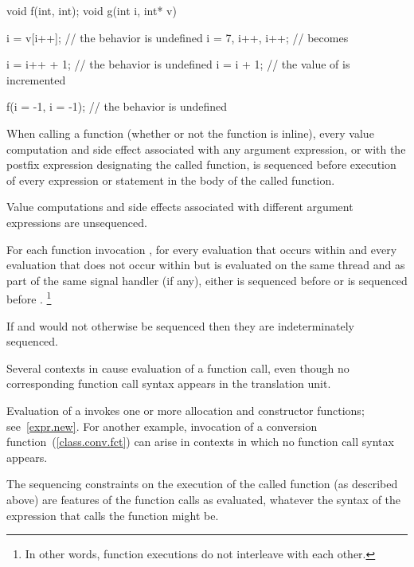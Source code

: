 \begin{example}

\begin{codeblock}
void f(int, int);
void g(int i, int* v) {
  i = v[i++];         // the behavior is undefined
  i = 7, i++, i++;    //  becomes 

  i = i++ + 1;        // the behavior is undefined
  i = i + 1;          // the value of  is incremented

  f(i = -1, i = -1);  // the behavior is undefined
}
\end{codeblock}
\end{example}

When calling a function (whether or not the function is inline), every
%
value computation and
%
side effect associated with any argument
expression, or with the postfix expression designating the called
function, is sequenced before execution of every expression or statement
in the body of the called function. \begin{note}
Value computations and
side effects associated with different argument expressions are
unsequenced. \end{note}
For each function invocation ,
for every evaluation  that occurs within  and
every evaluation  that does not occur within  but
is evaluated on the same thread and as part of the same signal handler (if any),
either  is sequenced before  or
 is sequenced before .
\footnote{In other words, function executions do not interleave with
each other.}
\begin{note}
If  and  would not otherwise be sequenced then they are
indeterminately sequenced.
\end{note}
Several contexts in \Cpp  cause evaluation of a function call, even
though no corresponding function call syntax appears in the translation
unit.
\begin{example}
Evaluation of a  invokes one or more allocation
and constructor functions; see~\ref{expr.new}. For another example,
invocation of a conversion function~(\ref{class.conv.fct}) can arise in
contexts in which no function call syntax appears.
\end{example}
The sequencing constraints on the execution of the called function (as
described above) are features of the function calls as evaluated,
whatever the syntax of the expression that calls the function might be.%
%

